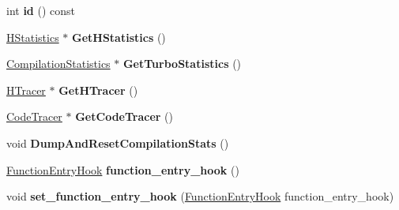 \begin{DoxyCompactItemize}
\item 
int {\bfseries id} () const \hypertarget{classv8_1_1internal_1_1_isolate_a6b9bfb2f48c9f9d8b76a127ee6664da8}{}\label{classv8_1_1internal_1_1_isolate_a6b9bfb2f48c9f9d8b76a127ee6664da8}

\item 
\hyperlink{classv8_1_1internal_1_1_h_statistics}{H\+Statistics} $\ast$ {\bfseries Get\+H\+Statistics} ()\hypertarget{classv8_1_1internal_1_1_isolate_aadcfeeb09af677d9b2fcee360bfa3255}{}\label{classv8_1_1internal_1_1_isolate_aadcfeeb09af677d9b2fcee360bfa3255}

\item 
\hyperlink{classv8_1_1internal_1_1_compilation_statistics}{Compilation\+Statistics} $\ast$ {\bfseries Get\+Turbo\+Statistics} ()\hypertarget{classv8_1_1internal_1_1_isolate_a8c6187c968e42c0e5a475458511fa522}{}\label{classv8_1_1internal_1_1_isolate_a8c6187c968e42c0e5a475458511fa522}

\item 
\hyperlink{classv8_1_1internal_1_1_h_tracer}{H\+Tracer} $\ast$ {\bfseries Get\+H\+Tracer} ()\hypertarget{classv8_1_1internal_1_1_isolate_a83e239c42a0eb2c6ce424d38a51580f3}{}\label{classv8_1_1internal_1_1_isolate_a83e239c42a0eb2c6ce424d38a51580f3}

\item 
\hyperlink{classv8_1_1internal_1_1_code_tracer}{Code\+Tracer} $\ast$ {\bfseries Get\+Code\+Tracer} ()\hypertarget{classv8_1_1internal_1_1_isolate_aae011e04ca5a2797e5ba70b298999c6c}{}\label{classv8_1_1internal_1_1_isolate_aae011e04ca5a2797e5ba70b298999c6c}

\item 
void {\bfseries Dump\+And\+Reset\+Compilation\+Stats} ()\hypertarget{classv8_1_1internal_1_1_isolate_a5590013b8cbe1e61a4f4f3c0231a335c}{}\label{classv8_1_1internal_1_1_isolate_a5590013b8cbe1e61a4f4f3c0231a335c}

\item 
\hyperlink{namespacev8_aaf07fb6bb13f295da3c6568938b7dec5}{Function\+Entry\+Hook} {\bfseries function\+\_\+entry\+\_\+hook} ()\hypertarget{classv8_1_1internal_1_1_isolate_a4cb4122dc3aa3e140831332461ebcfa2}{}\label{classv8_1_1internal_1_1_isolate_a4cb4122dc3aa3e140831332461ebcfa2}

\item 
void {\bfseries set\+\_\+function\+\_\+entry\+\_\+hook} (\hyperlink{namespacev8_aaf07fb6bb13f295da3c6568938b7dec5}{Function\+Entry\+Hook} function\+\_\+entry\+\_\+hook)\hypertarget{classv8_1_1internal_1_1_isolate_acb73f9809c18826744761f5331dbcfd2}{}\label{classv8_1_1internal_1_1_isolate_acb73f9809c18826744761f5331dbcfd2}


\end{DoxyCompactItemize}
